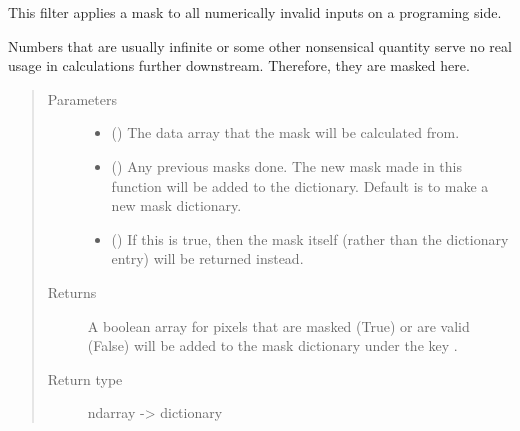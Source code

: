 \documentclass[letterpaper,10pt,english]{sphinxmanual}
\begin{document}
\begin{fulllineitems}
\label{\detokenize{python_docstrings/IfA_Smeargle.echo.masks.masks_echo000:IfA_Smeargle.echo.masks.masks_echo000.echo010_fixing_invalids}}
This filter applies a mask to all numerically invalid inputs on a
programing side.

Numbers that are usually infinite or some other nonsensical quantity
serve no real usage in calculations further downstream. Therefore, they
are masked here.
\begin{quote}\begin{description}
\item[{Parameters}] \leavevmode\begin{itemize}
\item {} 
 () \textendash{} The data array that the mask will be calculated from.

\item {} 
 (\sphinxstyleliteralemphasis{\sphinxupquote{ (}}\sphinxstyleliteralemphasis{\sphinxupquote{)}}) \textendash{} Any previous masks done. The new mask made in this function will be
added to the dictionary. Default is to make a new mask dictionary.

\item {} 
 (\sphinxstyleliteralemphasis{\sphinxupquote{ (}}\sphinxstyleliteralemphasis{\sphinxupquote{)}}) \textendash{} If this is true, then the mask itself (rather than the dictionary
entry) will be returned instead.

\end{itemize}

\item[{Returns}] \leavevmode
{} \textendash{} A boolean array for pixels that are masked (True) or are valid
(False) will be added to the mask dictionary under the
key .

\item[{Return type}] \leavevmode
ndarray -\textgreater{} dictionary

\end{description}\end{quote}

\end{fulllineitems}
\end{document}
